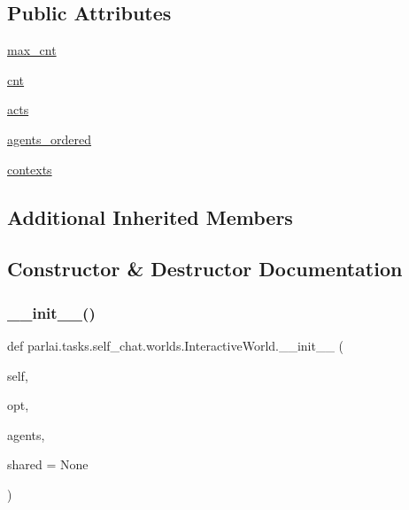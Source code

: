 \subsection*{Public Attributes}
\begin{DoxyCompactItemize}
\item 
\hyperlink{classparlai_1_1tasks_1_1self__chat_1_1worlds_1_1InteractiveWorld_a856612f2880e16bcec744257d7fdf87b}{max\+\_\+cnt}
\item 
\hyperlink{classparlai_1_1tasks_1_1self__chat_1_1worlds_1_1InteractiveWorld_a192bb93be23e21b7e26a25e799c02042}{cnt}
\item 
\hyperlink{classparlai_1_1tasks_1_1self__chat_1_1worlds_1_1InteractiveWorld_a908bd098cba2293d8061d07986b54164}{acts}
\item 
\hyperlink{classparlai_1_1tasks_1_1self__chat_1_1worlds_1_1InteractiveWorld_a6e2bdd8e526ae0c6bd83578284700ff9}{agents\+\_\+ordered}
\item 
\hyperlink{classparlai_1_1tasks_1_1self__chat_1_1worlds_1_1InteractiveWorld_aa59af07b6a16cb4440a6b4096393980a}{contexts}
\end{DoxyCompactItemize}
\subsection*{Additional Inherited Members}


\subsection{Constructor \& Destructor Documentation}
\mbox{\label{classparlai_1_1tasks_1_1self__chat_1_1worlds_1_1InteractiveWorld_a05a58b87b6b23a3a5c6ca1aca8ec230f}} 
\subsubsection{\texorpdfstring{\+\_\+\+\_\+init\+\_\+\+\_\+()}{\_\_init\_\_()}}
{\footnotesize\ttfamily def parlai.\+tasks.\+self\+\_\+chat.\+worlds.\+Interactive\+World.\+\_\+\+\_\+init\+\_\+\+\_\+ (\begin{DoxyParamCaption}\item[{}]{self,  }\item[{}]{opt,  }\item[{}]{agents,  }\item[{}]{shared = {\ttfamily None} }\end{DoxyParamCaption})}



